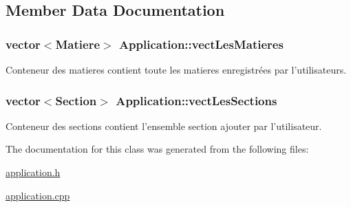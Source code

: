 \subsection{Member Data Documentation}
\hypertarget{class_application_ac89cdfc35f9f6b669fc56fda66f97757}{
\subsubsection[{vect\+Les\+Matieres}]{\setlength{\rightskip}{0pt plus 5cm}vector$<${\bf Matiere}$>$ Application\+::vect\+Les\+Matieres\hspace{0.3cm}{\ttfamily [private]}}}\label{class_application_ac89cdfc35f9f6b669fc56fda66f97757}


Conteneur des matieres contient toute les matieres enregistrées par l'utilisateurs. 

\hypertarget{class_application_afcbd29699ca1631db2798a23ccb5a663}{
\subsubsection[{vect\+Les\+Sections}]{\setlength{\rightskip}{0pt plus 5cm}vector$<${\bf Section}$>$ Application\+::vect\+Les\+Sections\hspace{0.3cm}{\ttfamily [private]}}}\label{class_application_afcbd29699ca1631db2798a23ccb5a663}


Conteneur des sections contient l'ensemble section ajouter par l'utilisateur. 



The documentation for this class was generated from the following files\+:\begin{DoxyCompactItemize}
\item 
\hyperlink{application_8h}{application.\+h}\item 
\hyperlink{application_8cpp}{application.\+cpp}\end{DoxyCompactItemize}

